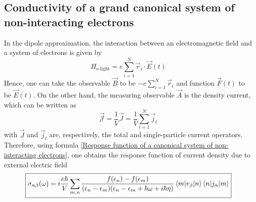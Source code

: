 \documentclass[a4paper,12pts,dvipsnames]{article}
\numberwithin{equation}{section}
\begin{document}
\subsection{Conductivity of a grand canonical system of non-interacting electrons}
In the dipole approximation, the interaction between an electromagnetic field and a system of electrons is given by
\begin{equation}
	H_{\text{e-light}} = e\sum_{i=1}^N\vec{r}_i\cdot\vec{E}(t)
\end{equation}
Hence, one can take the observable $\vec{B}$ to be $-e\displaystyle\sum_{i=1}^N\vec{r}_i$ and function $\vec{F}(t)$ to be $\vec{E}(t)$. On the other hand, the measuring observable $\vec{A}$ is the density current, which can be written as
\begin{equation}
\vec{\mathcal{J}} = \frac{1}{V}\vec{J} = \frac{1}{V}\sum_{l=1}^N\vec{j}_l
\end{equation}
with $\vec{J}$ and $\vec{j}_l$ are, respectively, the total and single-particle current operators. Therefore, using formula \ref{Response function of a canonical system of non-interacting electrons}, one obtains the response function of current density due to external electric field
\begin{equation}
\boxed{\sigma_{\alpha\beta}(\omega) = i\frac{e\hbar}{V}\sum_{m,n}\frac{f(\epsilon_{n})-f(\epsilon_{m})}{(\epsilon_{n}-\epsilon_{m})(\epsilon_n-\epsilon_m+\hbar\omega+i\hbar\eta)}\braket{m|v_{\beta}|n}\braket{n|j_{\alpha}|m}}
\end{equation}

\pagebreak

\listofmyequations
\end{document}
